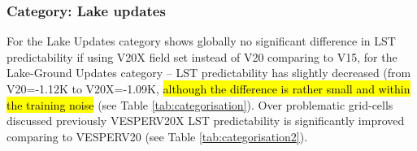 \documentclass[hess, twostagejnl]{copernicus}
\begin{document}
\subsubsection{Category: Lake updates}

For the Lake Updates category shows globally no significant difference in LST predictability if using V20X field set instead of V20 comparing to V15, for the Lake-Ground Updates category – LST predictability has slightly decreased (from V20=-1.12K to V20X=-1.09K, \hl{although the difference is rather small and within the training noise} (see Table \ref{tab:categorisation}). Over problematic grid-cells discussed previously VESPERV20X LST predictability is significantly improved comparing to VESPERV20 (see Table \ref{tab:categorisation2}). 
\end{document}
